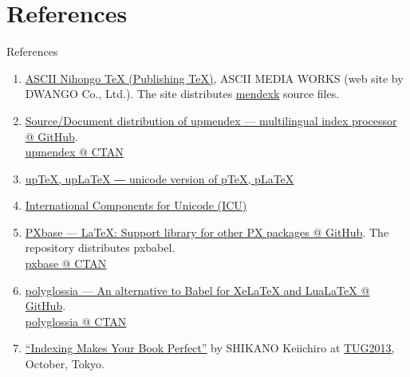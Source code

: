 \documentclass[aspectratio=169,10pt]{beamer}
\begin{document}
\section{References}
\begin{frame}{References}

\begin{enumerate}
 \item \href{https://asciidwango.github.io/ptex/}{ASCII Nihongo TeX (Publishing TeX)}, ASCII MEDIA WORKS (web site by DWANGO Co., Ltd.).
  The site distributes \href{https://asciidwango.github.io/ptex/base/sources.html\#mendexk}{mendexk} source files.
 \item \href{https://github.com/t-tk/upmendex-package}{Source/Document distribution of upmendex --- multilingual index processor @ GitHub}.\\
   \href{https://ctan.org/pkg/upmendex/}{upmendex @ CTAN}
 \item \href{http://www.t-lab.opal.ne.jp/tex/uptex_en.html}{upTeX, upLaTeX ― unicode version of pTeX, pLaTeX}
 \item \href{https://icu.unicode.org/}{International Components for Unicode (ICU)}
 \item \href{https://github.com/zr-tex8r/PXbase}{PXbase --- LaTeX: Support library for other PX packages @ GitHub}.
    The repository distributes pxbabel.\\
   \href{https://ctan.org/pkg/pxbase/}{pxbase @ CTAN}
 \item \href{https://github.com/reutenauer/polyglossia}{polyglossia --- An alternative to Babel for XeLaTeX and LuaLaTeX @ GitHub}.\\
   \href{https://ctan.org/pkg/polyglossia/}{polyglossia @ CTAN}
 \item \href{https://tug.org/tug2013/slides/shikano.pdf}{``Indexing Makes Your Book Perfect''} by SHIKANO Keiichiro at \href{https://tug.org/tug2013/}{TUG2013}, October, Tokyo.
\end{enumerate}


\end{frame}
\end{document}

